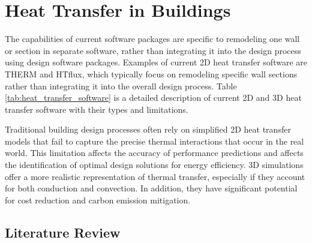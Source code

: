 \chapter{Heat Transfer in Buildings}



The capabilities of current software packages are specific to remodeling one wall or section in separate software, rather than integrating it into the design process using design software packages. Examples of current 2D heat transfer software are THERM and HTflux, which typically focus on remodeling specific wall sections rather than integrating it into the overall design process. Table \ref{tab:heat_transfer_software} is a detailed description of current 2D and 3D heat transfer software with their types and limitations. 

Traditional building design processes often rely on simplified 2D heat transfer models that fail to capture the precise thermal interactions that occur in the real world. This limitation affects the accuracy of performance predictions and affects the identification of optimal design solutions for energy efficiency. 
3D simulations offer a more realistic representation of thermal transfer, especially if they account for both conduction and convection. 
In addition, they have significant potential for cost reduction and carbon emission mitigation. 






\section{Literature Review}






